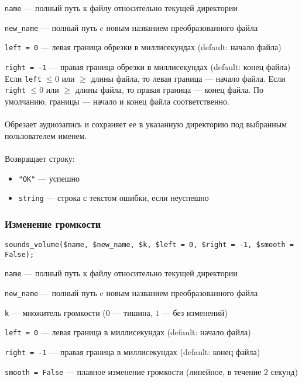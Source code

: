 \documentclass[14pt,a4paper]{article}
\begin{document}
\lstinline{name} --- полный путь к файлу относительно текущей директории \par
\lstinline{new_name} --- полный путь c новым названием преобразованного файла \par
\lstinline{left = 0} --- левая граница обрезки в миллисекундах (default: начало файла) \par
\lstinline{right = -1} --- правая граница обрезки в миллисекундах (default: конец файла) \\

\noindent Если \lstinline{left} $\leq 0$ или $\geq$ длины файла, то левая граница --- начало файла. Если \lstinline{right} $\leq 0$ или $\geq$ длины файла, то правая граница --- конец файла. По умолчанию, границы --- начало и конец файла соответственно. \\\\
Обрезает аудиозапись и сохраняет ее в указанную директорию под выбранным пользователем именем. \\\\
Возвращает строку:
\smallskip
\begin{itemize}
\item \lstinline{"OK"} --- успешно
\item \lstinline{string} --- строка с текстом ошибки, если неуспешно
\end{itemize}

\subsubsection*{Изменение громкости}

\begin{lstlisting}
sounds_volume($name, $new_name, $k, $left = 0, $right = -1, $smooth = False);
\end{lstlisting}

\lstinline{name} --- полный путь к файлу относительно текущей директории \par
\lstinline{new_name} --- полный путь c новым названием преобразованного файла \par
\lstinline{k} --- множитель громкости ($0$ --- тишина, $1$ --- без изменений)\par
\lstinline{left = 0} --- левая граница в миллисекундах (default: начало файла) \par
\lstinline{right = -1} --- правая граница в миллисекундах (default: конец файла) \par
\lstinline{smooth = False} --- плавное изменение громкости (линейное, в течение $2$ секунд) \\
\end{document}

